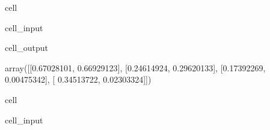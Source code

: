 \documentclass[letterpaper,10pt,english]{jupyterBook}
\begin{document}
\begin{sphinxuseclass}{cell}\begin{sphinxVerbatimInput}

\begin{sphinxuseclass}{cell_input}
\begin{sphinxVerbatim}[commandchars=\\\{\}]
\PYG{p}{[}\PYG{p}{[}\PYG{p}{]}\PYG{p}{]}
\end{sphinxVerbatim}

\end{sphinxuseclass}\end{sphinxVerbatimInput}
\begin{sphinxVerbatimOutput}

\begin{sphinxuseclass}{cell_output}
\begin{sphinxVerbatim}[commandchars=\\\{\}]
array([[\PYGZhy{}0.67028101, \PYGZhy{}0.66929123],
       [\PYGZhy{}0.24614924, \PYGZhy{}0.29620133],
       [\PYGZhy{}0.17392269,  0.00475342],
       [ 0.34513722,  0.02303324]])
\end{sphinxVerbatim}

\end{sphinxuseclass}\end{sphinxVerbatimOutput}

\end{sphinxuseclass}
\begin{sphinxuseclass}{cell}\begin{sphinxVerbatimInput}

\begin{sphinxuseclass}{cell_input}
\begin{sphinxVerbatim}[commandchars=\\\{\}]
      
\end{sphinxVerbatim}

\end{sphinxuseclass}\end{sphinxVerbatimInput}

\end{sphinxuseclass}
\end{document}
